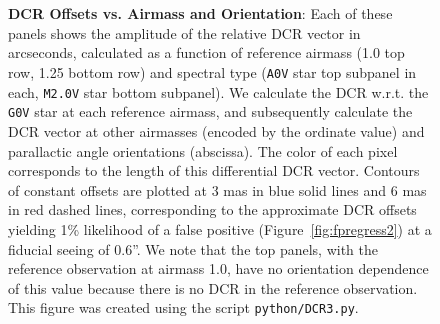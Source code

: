 \documentclass[prd, nofootinbib, floatfix, 11pt, tightenlines, times]{article}
\def\figdir{../figures}
\begin{document}
\begin{figure}[!ht]
  \centering
  \qquad
  \qquad
   \\
  \qquad
  \qquad
   \\
  \caption{{\bf DCR Offsets vs. Airmass and Orientation}: Each of
    these panels shows the amplitude of the relative DCR vector in
    arcseconds, calculated as a function of reference airmass (1.0 top
    row, 1.25 bottom row) and spectral type ({\tt A0V} star top
    subpanel in each, {\tt M2.0V} star bottom subpanel).  We calculate
    the DCR w.r.t. the {\tt G0V} star at each reference airmass, and
    subsequently calculate the DCR vector at other airmasses (encoded
    by the ordinate value) and parallactic angle orientations
    (abscissa).  The color of each pixel corresponds to the length of
    this differential DCR vector.  Contours of constant offsets are
    plotted at 3 mas in blue solid lines and 6 mas in red dashed
    lines, corresponding to the approximate DCR offsets yielding 1\%
    likelihood of a false positive (Figure~\ref{fig:fpregress2}) at a
    fiducial seeing of 0.6''.  We note that the top panels, with the
    reference observation at airmass 1.0, have no orientation
    dependence of this value because there is no DCR in the reference
    observation.
%
%
    This figure was created using the script {\tt python/DCR3.py}.}
  \label{fig:fpsummary}
\end{figure}
\end{document}
